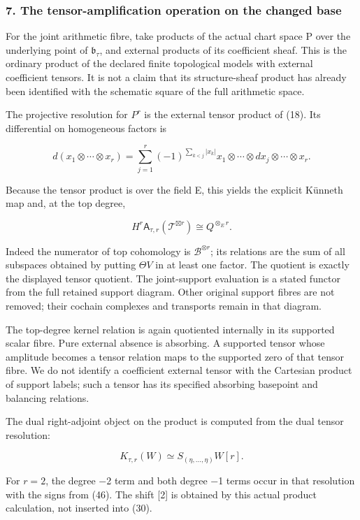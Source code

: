 \documentclass{article}
\begin{document}
\subsubsection{7. The tensor-amplification operation on the changed base}\label{endpoint-tau_base--the-tensor-amplification-operation-on-the-changed-base}

For the joint arithmetic fibre, take products of the actual chart space P over the underlying point of \(\mathfrak b_\tau\), and external products of its coefficient sheaf. This is the ordinary product of the declared finite topological models with external coefficient tensors. It is not a claim that its structure-sheaf product has already been identified with the schematic square of the full arithmetic space.

The projective resolution for \(P^r\) is the external tensor product of (18). Its differential on homogeneous factors is

\[
d(x_1\otimes\cdots\otimes x_r)=
\sum_{j=1}^r(-1)^{\sum_{k<j}|x_k|}
 x_1\otimes\cdots\otimes dx_j\otimes\cdots\otimes x_r.
\tag{46}
\]

Because the tensor product is over the field E, this yields the explicit Künneth map and, at the top degree,

\[
\boxed{
H^r\mathsf A_{\tau,r}(\mathcal T^{\boxtimes r})\cong Q^{\otimes_E r}.
}
\tag{47}
\]

Indeed the numerator of top cohomology is \(\mathscr B^{\otimes r}\); its relations are the sum of all subspaces obtained by putting \(\Theta V\) in at least one factor. The quotient is exactly the displayed tensor quotient. The joint-support evaluation is a stated functor from the full retained support diagram. Other original support fibres are not removed; their cochain complexes and transports remain in that diagram.

The top-degree kernel relation is again quotiented internally in its supported scalar fibre. Pure external absence is absorbing. A supported tensor whose amplitude becomes a tensor relation maps to the supported zero of that tensor fibre. We do not identify a coefficient external tensor with the Cartesian product of support labels; such a tensor has its specified absorbing basepoint and balancing relations.

The dual right-adjoint object on the product is computed from the dual tensor resolution:

\[
K_{\tau,r}(W)\simeq S_{(\eta,\ldots,\eta)}W[r].
\tag{48}
\]

For \(r=2\), the degree −2 term and both degree −1 terms occur in that resolution with the signs from (46). The shift {[}2{]} is obtained by this actual product calculation, not inserted into (30).
\end{document}
